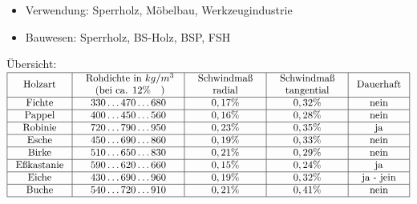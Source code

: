 \documentclass[fleqn,twoside]{article}
\begin{document}
\begin{itemize}
\begin{itemize}
\begin{itemize}
                            \item Verwendung: Sperrholz, Möbelbau, Werkzeugindustrie
                            \item Bauwesen: Sperrholz, BS-Holz, BSP, FSH
                        \end{itemize}
                \end{itemize}
                Übersicht: \vspace*{3mm}\\
                    $\begin{array}{|c|c|c|c|c|}
                        \hline \text { Holzart } & \begin{array}{c}
                        \text { Rohdichte in } k g / m^3 \\
                        \text { (bei ca. 12\% ~ )} 
                        \end{array} & \begin{array}{c}
                        \text { Schwindmaß } \\
                        \text { radial }
                        \end{array} & \begin{array}{c}
                        \text { Schwindmaß } \\
                        \text { tangential }
                        \end{array} & \text { Dauerhaft } \\
                        \hline \text { Fichte } & 330 \ldots 470 \ldots 680 & 0,17 \% & 0,32 \% & \text { nein } \\
                        \hline \text { Pappel } & 400 \ldots 450 \ldots 560 & 0,16 \% & 0,28 \% & \text { nein } \\
                        \hline \text { Robinie } & 720 \ldots 790 \ldots 950 & 0,23 \% & 0,35 \% & \text { ja } \\
                        \hline \text { Esche } & 450 \ldots 690 \ldots 860 & 0,19 \% & 0,33 \% & \text { nein } \\
                        \hline \text { Birke } & 510 \ldots 650 \ldots 830 & 0,21 \% & 0,29 \% & \text { nein } \\
                        \hline \text { Eßkastanie } & 590 \ldots 620 \ldots 660 & 0,15 \% & 0,24 \% & \text { ja } \\
                        \hline \text { Eiche } & 430 \ldots 690 \ldots 960 & 0,19 \% & 0,32 \% & \text { ja - jein } \\
                        \hline \text { Buche } & 540 \ldots 720 \ldots 910 & 0,21 \% & 0,41 \% & \text { nein } \\
                        \hline
                    \end{array}$


\end{itemize}
\end{document}
